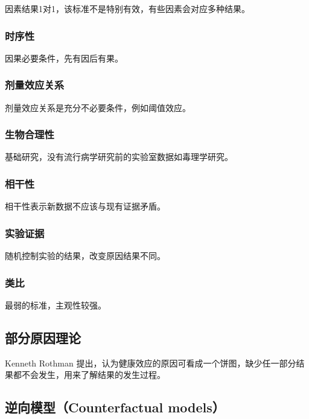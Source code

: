 \documentclass[]{book}
\begin{document}
因素结果1对1，该标准不是特别有效，有些因素会对应多种结果。

\subsubsection{时序性}

因果必要条件，先有因后有果。

\subsubsection{剂量效应关系}

剂量效应关系是充分不必要条件，例如阈值效应。

\subsubsection{生物合理性}

基础研究，没有流行病学研究前的实验室数据如毒理学研究。

\subsubsection{相干性}

相干性表示新数据不应该与现有证据矛盾。

\subsubsection{实验证据}

随机控制实验的结果，改变原因结果不同。

\subsubsection{类比}

最弱的标准，主观性较强。

\subsection{部分原因理论}

Kenneth Rothman 提出，认为健康效应的原因可看成一个饼图，缺少任一部分结果都不会发生，用来了解结果的发生过程。

\hypertarget{counterfactual-models}{%
\subsection{逆向模型（Counterfactual models）}\label{counterfactual-models}}
\end{document}
